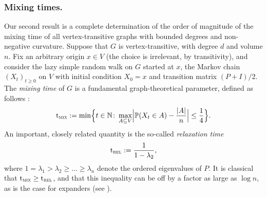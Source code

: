 \documentclass[JEP,XML,SOM,Unicode,NoEqCountersInSection,published]{cedram}
\theoremstyle{definition}
\newcommand{\dN}{\mathbb {N}}
\newcommand{\PP}{{\mathbb{P}}}
\newcommand{\trel}{\mathrm{t}_{\textup{\textsc{rel}}}}
\newcommand{\tmix}{\mathrm{t}_{\textup{\textsc{mix}}}}
\begin{document}
\subsubsection*{Mixing times.} Our second result is a complete determination of the order of magnitude of the mixing time of all vertex-transitive graphs with bounded degrees and non-negative curvature. Suppose that $G$ is vertex-transitive, with degree $d$ and volume $n$. Fix an arbitrary origin $x\in V$ (the choice is irrelevant, by transitivity), and consider the lazy simple random walk on $G$ started at $x$, \ie the Markov chain $(X_t)_{t\ge 0}$ on $V$ with initial condition $X_0=x$ and transition matrix $(P+I)/2$. The \emph{mixing time} of $G$ is a fundamental graph-theoretical parameter, defined as follows \cite{MR3726904}:
\begin{equation*}
\tmix := \min\Bigl\{t\in\dN\colon \max_{A\subseteq V}\Bigl|\PP(X_t\in A)-\frac{|A|}{n}\Bigr|\le \frac 14\Bigr\}.
\end{equation*}
An important, closely related quantity is the so-called \emph{relaxation time}
\begin{equation*}
\trel := \frac{1}{1-\lambda_{2}},
\end{equation*}
where $1=\lambda_1>\lambda_2\ge\ldots\ge\lambda_n$ denote the ordered eigenvalues of $P$. It is classical that $\tmix \ge \trel$, and that this inequality can be off by a factor as large as $\log n$, as is the case for expanders (see \cite{MR3726904}).
\end{document}
